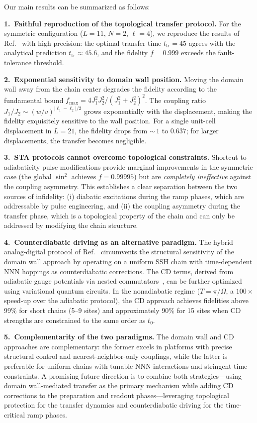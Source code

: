 \documentclass[
  reprint,
  amsmath,
  amssymb,
  aps,
  prb,
  longbibliography,
]{revtex4-2}
\newcommand{\ttr}{t_{\mathrm{tr}}}
\begin{document}
Our main results can be summarized as follows:

\textbf{1.~Faithful reproduction of the topological transfer protocol.}
For the symmetric configuration ($L = 11$, $N = 2$, $\ell = 4$), we reproduce
the results of Ref.~\cite{Zurita2023} with high precision: the optimal transfer
time $\ttr = 45$ agrees with the analytical prediction $\ttr \approx 45.6$, and
the fidelity $f = 0.999$ exceeds the fault-tolerance threshold.

\textbf{2.~Exponential sensitivity to domain wall position.}
Moving the domain wall away from the chain center degrades the fidelity
according to the fundamental bound
$f_{\max} = 4J_1^2 J_2^2/(J_1^2 + J_2^2)^2$. The coupling ratio
$J_1/J_2 \sim (w/v)^{|\ell_1 - \ell_2|/2}$ grows exponentially with the
displacement, making the fidelity exquisitely sensitive to the wall position.
For a single unit-cell displacement in $L = 21$, the fidelity drops from
${\sim}\,1$ to $0.637$; for larger displacements, the transfer becomes negligible.

\textbf{3.~STA protocols cannot overcome topological constraints.}
Shortcut-to-adiabaticity pulse modifications provide marginal improvements in
the symmetric case (the global $\sin^2$ achieves $f = 0.99995$) but are
\emph{completely ineffective} against the coupling asymmetry. This establishes
a clear separation between the two sources of infidelity: (i) diabatic
excitations during the ramp phases, which are addressable by pulse engineering,
and (ii) the coupling asymmetry during the transfer phase, which is a
topological property of the chain and can only be addressed by modifying the
chain structure.

\textbf{4.~Counterdiabatic driving as an alternative paradigm.}
The hybrid analog-digital protocol of Ref.~\cite{Romero2024} circumvents
the structural sensitivity of the domain wall approach by operating on a
uniform SSH chain with time-dependent NNN hoppings as counterdiabatic
corrections. The CD terms, derived from adiabatic gauge potentials via nested
commutators~\cite{Sels2017}, can be further optimized using variational quantum
circuits. In the nonadiabatic regime ($T = \pi/\Omega$, a $100\times$
speed-up over the adiabatic protocol), the CD approach achieves fidelities
above 99\% for short chains (5--9 sites) and approximately 90\% for 15 sites
when CD strengths are constrained to the same order as $t_0$.

\textbf{5.~Complementarity of the two paradigms.}
The domain wall and CD approaches are complementary: the former excels in
platforms with precise structural control and nearest-neighbor-only couplings,
while the latter is preferable for uniform chains with tunable NNN interactions
and stringent time constraints. A promising future direction is to combine both
strategies---using domain wall-mediated transfer as the primary mechanism while
adding CD corrections to the preparation and readout phases---leveraging
topological protection for the transfer dynamics and counterdiabatic driving for
the time-critical ramp phases.
\end{document}
